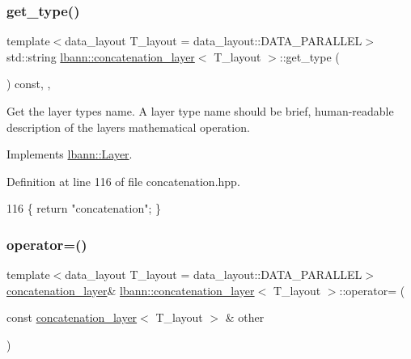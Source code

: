 \subsubsection{\texorpdfstring{get\+\_\+type()}{get\_type()}}
{\footnotesize\ttfamily template$<$data\+\_\+layout T\+\_\+layout = data\+\_\+layout\+::\+D\+A\+T\+A\+\_\+\+P\+A\+R\+A\+L\+L\+EL$>$ \\
std\+::string \hyperlink{classlbann_1_1concatenation__layer}{lbann\+::concatenation\+\_\+layer}$<$ T\+\_\+layout $>$\+::get\+\_\+type (\begin{DoxyParamCaption}{ }\end{DoxyParamCaption}) const\hspace{0.3cm}{\ttfamily [inline]}, {\ttfamily [override]}, {\ttfamily [virtual]}}

Get the layer type\textquotesingle{}s name. A layer type name should be brief, human-\/readable description of the layer\textquotesingle{}s mathematical operation. 

Implements \hyperlink{classlbann_1_1Layer_a0fa0ea9160b490c151c0a17fde4f7239}{lbann\+::\+Layer}.



Definition at line 116 of file concatenation.\+hpp.


\begin{DoxyCode}
116 \{ \textcolor{keywordflow}{return} \textcolor{stringliteral}{"concatenation"}; \}
\end{DoxyCode}
\mbox{\label{classlbann_1_1concatenation__layer_af91f0850e13dd854e095f2c9d00d58b2}} 
\subsubsection{\texorpdfstring{operator=()}{operator=()}}
{\footnotesize\ttfamily template$<$data\+\_\+layout T\+\_\+layout = data\+\_\+layout\+::\+D\+A\+T\+A\+\_\+\+P\+A\+R\+A\+L\+L\+EL$>$ \\
\hyperlink{classlbann_1_1concatenation__layer}{concatenation\+\_\+layer}\& \hyperlink{classlbann_1_1concatenation__layer}{lbann\+::concatenation\+\_\+layer}$<$ T\+\_\+layout $>$\+::operator= (\begin{DoxyParamCaption}\item[{const \hyperlink{classlbann_1_1concatenation__layer}{concatenation\+\_\+layer}$<$ T\+\_\+layout $>$ \&}]{other }\end{DoxyParamCaption})\hspace{0.3cm}{\ttfamily [inline]}}



